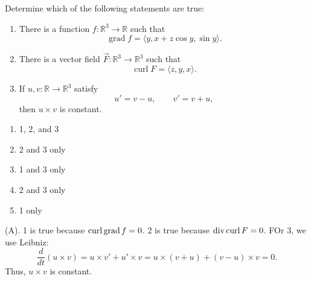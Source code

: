 \begin{exercise}
Determine which of the following statements are true:

\begin{enumerate}
    \item There is a function $f:\mathbb{R}^3\to\mathbb{R}$ such that
    \[
    \operatorname{grad} f
    =
    \langle y,x+z\cos y,\sin y\rangle.
    \]

    \item There is a vector field $\vec{F}:\mathbb{R}^3\to\mathbb{R}^3$ such that
    \[
    \operatorname{curl}F
    =
    \langle z,y,x\rangle.
    \]

    \item If $u,v:\mathbb{R}\to\mathbb{R}^3$ satisfy
    \[
    u'=v-u,
    \qquad
    v'=v+u,
    \]
    then $u\times v$ is constant.
\end{enumerate}

\begin{enumerate}[label=(\Alph*)]
    \item 1, 2, and 3
    \item 2 and 3 only
    \item 1 and 3 only
    \item 2 and 3 only
    \item 1 only
\end{enumerate}
\end{exercise}
\begin{solution}
(A). 1 is true because $\operatorname{curl} \operatorname{grad} f = 0$. 2 is true because 
$\operatorname{div} \operatorname{curl} F = 0$. FOr 3, we use Leibniz:
\[
\frac{d}{dt}(u \times v) = u \times v' + u' \times v
= u \times (v + u) + (v - u) \times v 
= 0.
\]
Thus, $u \times v$ is constant.
\end{solution}

